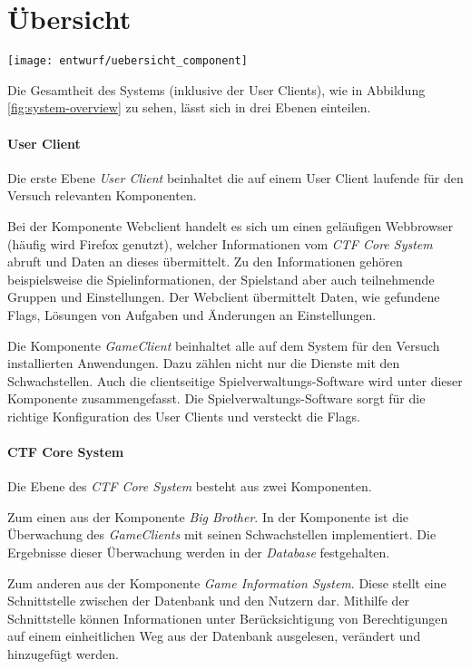 \section{Übersicht} \label{sec:Übersicht}
\begin{center}
	\texttt{[image: entwurf/uebersicht\_component]}
	\label{fig:system-overview}
\end{center}

Die Gesamtheit des Systems (inklusive der User Clients), wie in Abbildung \ref{fig:system-overview} zu sehen, lässt sich in drei Ebenen einteilen.

\paragraph{User Client}
Die erste Ebene \textit{User Client} beinhaltet die auf einem User Client laufende für den Versuch relevanten Komponenten.

Bei der Komponente Webclient handelt es sich um einen geläufigen Webbrowser (häufig wird Firefox genutzt), welcher Informationen vom \textit{CTF Core System} abruft und Daten an dieses übermittelt.
Zu den Informationen gehören beispielsweise die Spielinformationen, der Spielstand aber auch teilnehmende Gruppen und Einstellungen. Der Webclient übermittelt Daten, wie gefundene Flags, Lösungen von Aufgaben und Änderungen an Einstellungen.

Die Komponente \textit{GameClient} beinhaltet alle auf dem System für den Versuch installierten Anwendungen. Dazu zählen nicht nur die Dienste mit den Schwachstellen. Auch die clientseitige Spielverwaltungs-Software wird unter dieser Komponente zusammengefasst. Die Spielverwaltungs-Software sorgt für die richtige Konfiguration des User Clients und versteckt die Flags.

\paragraph{CTF Core System}
Die Ebene des \textit{CTF Core System} besteht aus zwei Komponenten. 

Zum einen aus der Komponente \textit{Big Brother}. In der Komponente ist die Überwachung des \textit{GameClients} mit seinen Schwachstellen implementiert. Die Ergebnisse dieser Überwachung werden in der \textit{Database} festgehalten.

Zum anderen aus der Komponente \textit{Game Information System}. Diese stellt eine Schnittstelle zwischen der Datenbank und den Nutzern dar. Mithilfe der Schnittstelle können Informationen unter Berücksichtigung von Berechtigungen auf einem einheitlichen Weg aus der Datenbank ausgelesen, verändert und hinzugefügt werden. 

